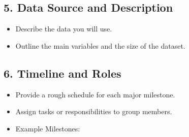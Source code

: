 \documentclass[12pt]{article}
\begin{document}
\subsection*{5. Data Source and Description}
\begin{itemize}
    \item Describe the data you will use.
    \item Outline the main variables and the size of the dataset.
\end{itemize}

\subsection*{6. Timeline and Roles}
\begin{itemize}
    \item Provide a rough schedule for each major milestone.
    \item Assign tasks or responsibilities to group members.
    \item Example Milestones:
    \begin{enumerate}


\end{enumerate}
\end{itemize}
\end{document}
